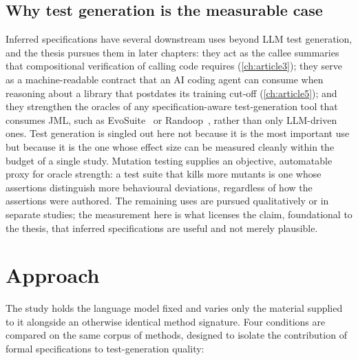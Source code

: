 \subsection{Why test generation is the measurable case}
\label{sec:art1:why-tests}

Inferred specifications have several downstream uses beyond LLM test generation,
and the thesis pursues them in later chapters: they act as the callee summaries
that compositional verification of calling code requires (\cref{ch:article3}); they
serve as a machine-readable contract that an AI coding agent can consume when
reasoning about a library that postdates its training cut-off (\cref{ch:article5});
and they strengthen the oracles of any specification-aware test-generation tool
that consumes JML, such as EvoSuite~\citep{fraser2011evosuite} or
Randoop~\citep{pacheco2007randoop}, rather than only LLM-driven ones. Test
generation is singled out here not because it is the most important use but
because it is the one whose effect size can be measured cleanly within the budget
of a single study. Mutation testing supplies an objective, automatable proxy for
oracle strength: a test suite that kills more mutants is one whose assertions
distinguish more behavioural deviations, regardless of how the assertions were
authored. The remaining uses are pursued qualitatively or in separate studies; the
measurement here is what licenses the claim, foundational to the thesis, that
inferred specifications are useful and not merely plausible.

\section{Approach}
\label{sec:art1:approach}

The study holds the language model fixed and varies only the material supplied to
it alongside an otherwise identical method signature. Four conditions are compared
on the same corpus of methods, designed to isolate the contribution of formal
specifications to test-generation quality:


